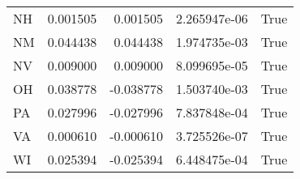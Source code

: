 \begin{table}
\begin{tabular}{lrrrl}
      NH &   0.001505 &  0.001505 &   2.265947e-06 &          True \\
      NM &   0.044438 &  0.044438 &   1.974735e-03 &          True \\
      NV &   0.009000 &  0.009000 &   8.099695e-05 &          True \\
      OH &   0.038778 & -0.038778 &   1.503740e-03 &          True \\
      PA &   0.027996 & -0.027996 &   7.837848e-04 &          True \\
      VA &   0.000610 & -0.000610 &   3.725526e-07 &          True \\
      WI &   0.025394 & -0.025394 &   6.448475e-04 &          True \\
\bottomrule
\end{tabular}
\end{table}
